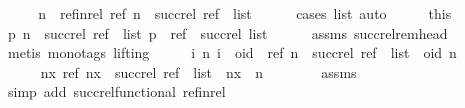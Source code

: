 \begin{isabellebody}
%
\isadelimproof
%
\endisadelimproof
%
\isatagproof
{}\isamarkupfalse%
\ {\isacharminus}\isanewline
\ \ \isamarkupfalse%
\ n\ \ ref{\isacharunderscore}in{\isacharunderscore}rel{\isacharcolon}\ {\isachardoublequoteopen}{\isacharparenleft}ref{\isacharcomma}\ n{\isacharparenright}\ {\isasymin}\ succ{\isacharunderscore}rel\ {\isacharparenleft}ref\ {\isacharhash}\ list{\isacharparenright}{\isachardoublequoteclose}\isanewline
\ \ \ \ \isamarkupfalse%
\ {\isacharparenleft}cases\ list{\isacharcomma}\ auto{\isacharparenright}\isanewline
\ \ \isamarkupfalse%
\ \isamarkupfalse%
\ this\ \isamarkupfalse%
\ {\isachardoublequoteopen}{\isacharbraceleft}{\isacharparenleft}p{\isacharcomma}\ n{\isacharparenright}\ {\isasymin}\ succ{\isacharunderscore}rel\ {\isacharparenleft}ref\ {\isacharhash}\ list{\isacharparenright}{\isachardot}\ p\ {\isasymnoteq}\ ref{\isacharbraceright}\ {\isacharequal}\ succ{\isacharunderscore}rel\ list{\isachardoublequoteclose}\isanewline
\ \ \ \ \isamarkupfalse%
\ assms\ succ{\isacharunderscore}rel{\isacharunderscore}rem{\isacharunderscore}head\ \isamarkupfalse%
\ {\isacharparenleft}metis\ {\isacharparenleft}mono{\isacharunderscore}tags{\isacharcomma}\ lifting{\isacharparenright}{\isacharparenright}\isanewline
\ \ \isamarkupfalse%
\ \isamarkupfalse%
\ {\isachardoublequoteopen}{\isacharbraceleft}{\isacharparenleft}i{\isacharcomma}\ n{\isacharparenright}{\isachardot}\ i\ {\isacharequal}\ oid\ {\isasymand}\ {\isacharparenleft}ref{\isacharcomma}\ n{\isacharparenright}\ {\isasymin}\ succ{\isacharunderscore}rel\ {\isacharparenleft}ref\ {\isacharhash}\ list{\isacharparenright}{\isacharbraceright}\ {\isacharequal}\ {\isacharbraceleft}{\isacharparenleft}oid{\isacharcomma}\ n{\isacharparenright}{\isacharbraceright}{\isachardoublequoteclose}\isanewline
\ \ \isamarkupfalse%
\ {\isacharminus}\isanewline
\ \ \ \ \isamarkupfalse%
\ {\isachardoublequoteopen}{\isasymAnd}nx{\isachardot}\ {\isacharparenleft}ref{\isacharcomma}\ nx{\isacharparenright}\ {\isasymin}\ succ{\isacharunderscore}rel\ {\isacharparenleft}ref\ {\isacharhash}\ list{\isacharparenright}\ {\isasymLongrightarrow}\ nx\ {\isacharequal}\ n{\isachardoublequoteclose}\isanewline
\ \ \ \ \ \ \isamarkupfalse%
\ assms\ \isamarkupfalse%
\ {\isacharparenleft}simp\ add{\isacharcolon}\ succ{\isacharunderscore}rel{\isacharunderscore}functional\ ref{\isacharunderscore}in{\isacharunderscore}rel{\isacharparenright}\isanewline

\end{isabellebody}
